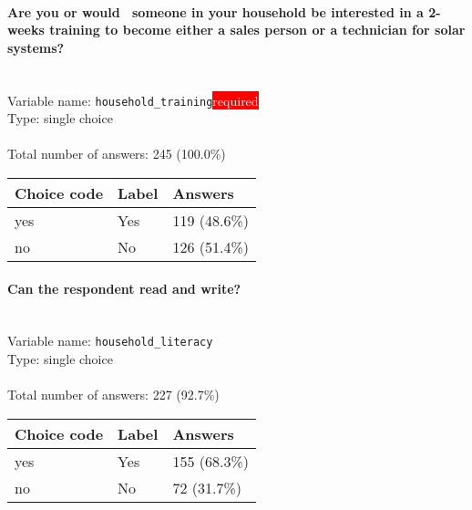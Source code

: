 \documentclass[11.5pt, a4paper]{scrartcl}
\begin{document}
\paragraph{Are you or would  someone in your household be interested in a 2-weeks training to become either a sales person or a technician for solar systems?}
\  \\Variable name: \texttt{household\_training}\hfill\colorbox{red}{\small{\textcolor{white}{required}}}\\
 Type: single choice\\
\\Total number of answers: 245 (100.0\%)
\\[0.2em] \begin{tabular}{p{4cm}|p{8cm}|p{3cm}}
Choice code & Label & Answers \\
\hline
yes & Yes& \cellcolor{color2}119 (48.6\%)\\
\cellcolor{mygray} no & \cellcolor{mygray}No & \cellcolor{color2}126 (51.4\%)\\
\end{tabular}
\paragraph{Can the respondent read and write?}
\  \\Variable name: \texttt{household\_literacy}\\
Type: single choice\\
\\Total number of answers: 227 (92.7\%)
\\[0.2em] \begin{tabular}{p{4cm}|p{8cm}|p{3cm}}
Choice code & Label & Answers \\
\hline
yes & Yes& \cellcolor{color3}155 (68.3\%)\\
\cellcolor{mygray} no & \cellcolor{mygray}No & \cellcolor{color1}72 (31.7\%)\\
\end{tabular}
\end{document}

